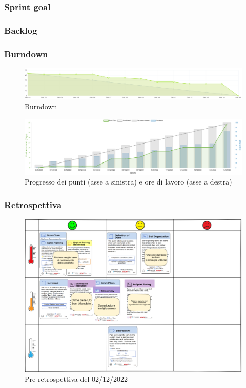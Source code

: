 \subsubsection{Sprint goal}
\subsubsection{Backlog}
\subsubsection{Burndown}
\begin{figure}[H]
    \centering
    \includegraphics[width=15cm]{./img/sprint4/burndown.png}
    \caption{Burndown}
\end{figure}
\begin{figure}[H]
    \centering
    \includegraphics[width=15cm]{./img/sprint4/worktime.png}
    \caption{Progresso dei punti (asse a sinistra) e ore di lavoro (asse a destra)}
\end{figure}
\subsubsection{Retrospettiva}
\begin{figure}[H]
    \centering
    \includegraphics[width=15cm]{./img/sprint4/retrospettiva.png}
    \caption{Pre-retrospettiva del 02/12/2022}
\end{figure}